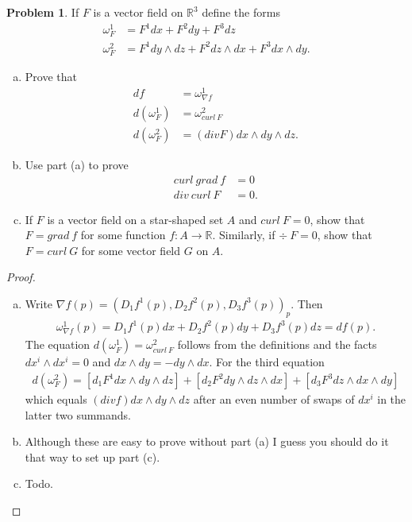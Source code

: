\documentclass[20pt]{article}
\theoremstyle{plain}
\theoremstyle{definition}
\newtheorem*{problem}{Problem}
\newcommand{\reals}{\mathbb{R}}
\begin{document}
\begin{problem}{4.19}
  If $F$ is a vector field on $\reals^3$ define the forms 
  \begin{align*}
    \omega^1_F &= F^1 dx + F^2 dy + F^3 dz \\
    \omega^2_F &= F^1 dy \wedge dz + F^2 dz \wedge dx + F^3 dx \wedge dy. 
  \end{align*}
  \begin{enumerate}[(a)]
    \item Prove that
    \begin{align*}
      df &= \omega^1_{\nabla f}\\
      d(\omega^1_F) &= \omega^2_{curl\ F} \\
      d(\omega^2_F) &= (div F)dx \wedge dy \wedge dz.
    \end{align*}
    \item 
    Use part (a) to prove
    \begin{align*}
      curl \ grad\ f &= 0 \\
      div \ curl \ F &= 0.
    \end{align*}
    \item 
    If $F$ is a vector field on a star-shaped set $A$ and $curl\ F = 0$, show that 
    $F = grad\ f$ for some function $f: A \to \reals$.  Similarly, if $\div\ F = 0$, 
    show that $F = curl\ G$ for some vector field $G$ on $A$.
  \end{enumerate}
\end{problem}

\begin{proof}
  \begin{enumerate}[(a)]
  \item
  Write $\nabla f(p) = (D_1f^1(p), D_2f^2(p), D_3f^3(p))_p.$
  Then 
  \begin{align*}
    \omega^1_{\nabla f}(p) = D_1f^1(p)dx + D_2f^2(p)dy + D_3f^3(p)dz = df(p).
  \end{align*}
  The equation $d(\omega^1_F) = \omega^2_{curl\ F}$
  follows from the definitions and the facts 
  $dx^i \wedge dx^i = 0$ and $dx \wedge dy = -dy \wedge dx$.
  For the third equation 
  \begin{align*}
    d(\omega^2_F) = 
    [d_1F^1 dx \wedge dy \wedge dz] + 
    [d_2F^2 dy \wedge dz \wedge dx] + 
    [d_3F^3 dz \wedge dx \wedge dy]
  \end{align*}
  which equals $(div f) dx \wedge dy \wedge dz$
  after an even number of swaps of $dx^i$ in the latter two summands.
  \item 
  {\color{Blue}Although these are easy to prove without part (a) I guess you should do it that way to set
    up part (c).}
	\item {\color{Blue} Todo.}	
  \end{enumerate}
\end{proof}
\end{document}
